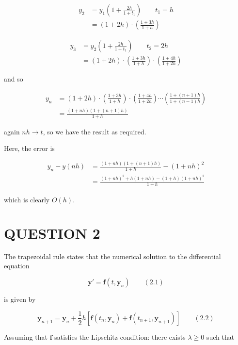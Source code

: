 \documentclass[a4paper]{article}
\begin{document}
\begin{align*}
y_{2} & = y_{1} \left(  1 + \frac{2h}{1+t_{1}} \right) \qquad t_{1} = h \\
& = (1+2h) \cdot \left(  \frac{1+3h}{1+h}  \right) 
\end{align*}


\begin{align*}
y_{3} & = y_{2} \left(  1 + \frac{2h}{1+t_{1}} \right) \qquad t_{2} = 2h \\
& = (1+2h) \cdot \left(  \frac{1+3h}{1+h}  \right) \cdot \left(  \frac{1+4h}{1+2h} \right) 
\end{align*}

and so

\begin{align*}
y_{n} & = (1+2h) \cdot \left(  \frac{1+3h}{1+h}  \right) \cdot \left(  \frac{1+4h}{1+2h} \right) \cdots \left(  \frac{1 + (n+1)h}{1 + (n-1)h} \right)  \\
& = \frac{(1+nh)(1+(n+1)h)}{1+h} 
\end{align*}

again $ nh \to t $, so we have the result as required. 

Here, the error is 


\begin{align*}
y_{n} - y(nh) & = \frac{(1+nh)(1+(n+1)h)}{1+h} - (1 + nh)^{2} \\
& =  \frac{(1+nh)^{2} + h(1 + nh) -(1+h)(1 + nh)^{2}  }{1+h} 
\end{align*}

which is clearly $ O(h) $. 








\section{QUESTION 2}

The trapezoidal rule states that the numerical solution to the differential equation

\[ \mathbf{y}' = \mathbf{f}(t,\mathbf{y}_{n}) \qquad (2.1) \]

is given by

\[ \mathbf{y}_{n+1} = \mathbf{y}_{n} + \frac{1}{2} h [ \mathbf{f}(t_{n},\mathbf{y}_{n}) + \mathbf{f}(t_{n+1},\mathbf{y}_{n+1})  ] \qquad (2.2) \]

Assuming that $ \mathbf{f} $ satisfies the Lipschitz condition: there exists $ \lambda  \geq 0 $ such that
\end{document}
